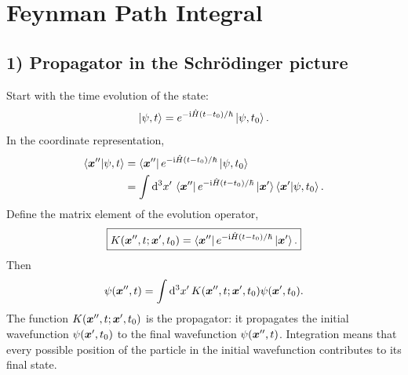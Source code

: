 \section{Feynman Path Integral}
\subsection*{1) Propagator in the Schr\"odinger picture}
Start with the time evolution of the state:
\begin{equation}
\left|\psi,t\right\rangle=e^{-\mathrm{i}\hat{H}(t-t_0)/\hbar}\left|\psi,t_0\right\rangle.
\end{equation}
In the coordinate representation,
\begin{equation}
\begin{split}
\left\langle\bm{x}''\middle|\psi,t\right\rangle
&=\left\langle\bm{x}''\right|e^{-\mathrm{i}\hat{H}(t-t_0)/\hbar}\left|\psi,t_0\right\rangle\\
&=\int\mathrm{d}^3x'\,\left\langle\bm{x}''\right|e^{-\mathrm{i}\hat{H}(t-t_0)/\hbar}
\left|\bm{x}'\right\rangle\left\langle\bm{x}'\middle|\psi,t_0\right\rangle.
\end{split}
\end{equation}
Define the matrix element of the evolution operator,
\begin{equation}
\boxed{K(\bm{x}'',t;\bm{x}',t_0)
=\left\langle\bm{x}''\right|e^{-\mathrm{i}\hat{H}(t-t_0)/\hbar}\left|\bm{x}'\right\rangle.}
\end{equation}
Then
\begin{equation}
\psi(\bm{x}'',t)=\int\mathrm{d}^3x'\,
K(\bm{x}'',t;\bm{x}',t_0)\psi(\bm{x}',t_0).
\end{equation}
The function $K(\bm{x}'',t;\bm{x}',t_0)$ is the propagator: it propagates the initial wavefunction $\psi(\bm{x}',t_0)$ to the final wavefunction $\psi(\bm{x}'',t)$. Integration means that every possible position of the particle in the initial wavefunction contributes to its final state.

